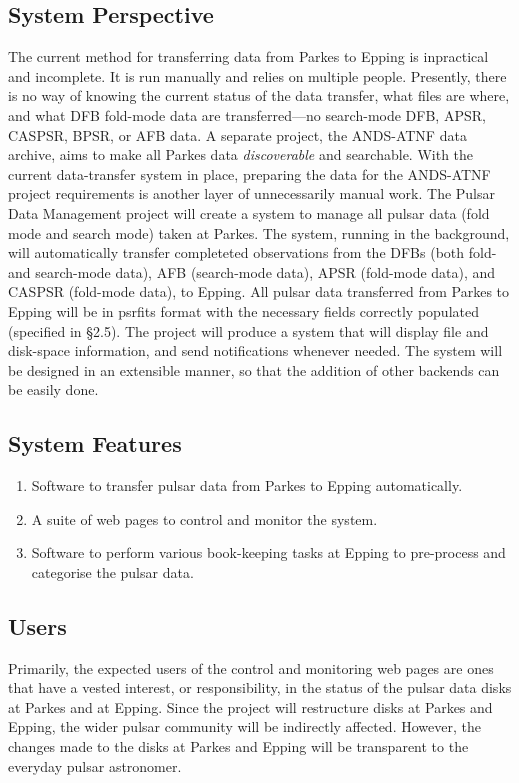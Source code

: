 \documentclass[a4paper,11pt]{article}
\begin{document}
\subsection{System Perspective}
The current method for transferring data from Parkes to Epping is inpractical and incomplete. It is run manually and relies on multiple people. Presently, there is no way of knowing the current status of the data transfer, what files are where, and what DFB fold-mode data are transferred---no search-mode DFB, APSR, CASPSR, BPSR, or AFB data. A separate project, the ANDS-ATNF data archive, aims to make all Parkes data \emph{discoverable} and searchable. With the current data-transfer system in place, preparing the data for the ANDS-ATNF project requirements is another layer of unnecessarily manual work.
The Pulsar Data Management project will create a system to manage all pulsar data (fold mode and search mode) taken at Parkes. The system, running in the background, will automatically transfer completeted observations from the DFBs (both fold- and search-mode data), AFB (search-mode data), APSR (fold-mode data), and CASPSR (fold-mode data), to Epping. All pulsar data transferred from Parkes to Epping will be in psrfits format with the necessary fields correctly populated (specified in \S 2.5). The project will produce a system that will display file and disk-space information, and send notifications whenever needed. The system will be designed in an extensible manner, so that the addition of other backends can be easily done.

\subsection{System Features}
\begin{enumerate}
\item Software to transfer pulsar data from Parkes to Epping automatically.
\item A suite of web pages to control and monitor the system.
\item Software to perform various book-keeping tasks at Epping to pre-process and categorise the pulsar data.
\end{enumerate}

\subsection{Users}
Primarily, the expected users of the control and monitoring web pages are ones that have a vested interest, or responsibility, in the status of the pulsar data disks at Parkes and at Epping. Since the project will restructure disks at Parkes and Epping, the wider pulsar community will be indirectly affected. However, the changes made to the disks at Parkes and Epping will be transparent to the everyday pulsar astronomer.
\end{document}
